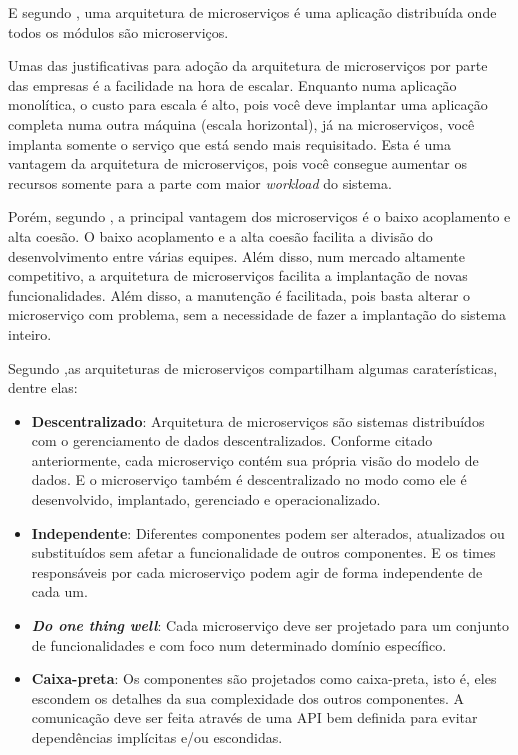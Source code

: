 \documentclass[12pt]{article}
\theoremstyle{plain}
\begin{document}
E segundo \cite{Dragoni2017}, uma arquitetura de microserviços é uma aplicação distribuída onde todos os módulos são microserviços.

Umas das justificativas para adoção da arquitetura de microserviços por parte das empresas é a facilidade na hora de escalar. Enquanto numa aplicação monolítica, o custo para escala é alto, pois você deve implantar uma aplicação completa numa outra máquina (escala horizontal), já na microserviços, você implanta somente o serviço que está sendo mais requisitado. Esta é uma vantagem da arquitetura de microserviços, pois você consegue aumentar os recursos somente para a parte com maior \textit{workload} do sistema. 

Porém, segundo \cite{wolf:2018}, a principal vantagem dos microserviços é o baixo acoplamento e alta coesão. O baixo acoplamento e a alta coesão facilita a divisão do desenvolvimento entre várias equipes. Além disso, num mercado altamente competitivo, a arquitetura de microserviços facilita a implantação de novas funcionalidades. Além disso, a manutenção é facilitada, pois basta alterar o microserviço com problema, sem a necessidade de fazer a implantação do sistema inteiro.

Segundo \cite{jung:2017},as arquiteturas de microserviços compartilham algumas caraterísticas, dentre elas:

\begin{itemize}
    \item \textbf{Descentralizado}: Arquitetura de microserviços são sistemas distribuídos com o gerenciamento de dados descentralizados. Conforme citado anteriormente, cada microserviço contém sua própria visão do modelo de dados. E o microserviço também é descentralizado no modo como ele é desenvolvido, implantado, gerenciado e operacionalizado.
    \item \textbf{Independente}: Diferentes componentes podem ser alterados, atualizados ou substituídos sem afetar a funcionalidade de outros componentes. E os times responsáveis por cada microserviço podem agir de forma independente de cada um.
    \item \textbf{\textit{Do one thing well}}: Cada microserviço deve ser projetado para um conjunto de funcionalidades e com foco num determinado domínio específico.
    \item \textbf{Caixa-preta}: Os componentes são projetados como caixa-preta, isto é, eles escondem os detalhes da sua complexidade dos outros componentes. A comunicação deve ser feita através de uma API bem definida para evitar dependências implícitas e/ou escondidas.
\end{itemize}
\end{document}

